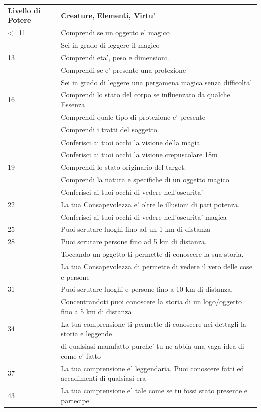\documentclass[a4paper,11pt,twoside,openany]{book}
\begin{document}
\begin{tabularx}{\textwidth}{lX}
	\toprule
	\textbf{Livello di Potere} & \textbf{Creature, Elementi, Virtu'}\tabularnewline
	<=11   & Comprendi se un oggetto e’ magico  \\
	  & Sei in grado di leggere il magico  \\
	13& Comprendi eta’, peso e dimensioni. \\
	  & Comprendi se e’ presente una protezione \\
	  & Sei in grado di leggere una pergamena magica senza difficolta’   \\
	16& Comprendi lo stato del corpo se influenzato da qualche Essenza   \\
	  & Comprendi quale tipo di protezione e’ presente    \\
	  & Comprendi i tratti del soggetto.   \\
	  & Conferisci ai tuoi occhi la visione della magia   \\
	  & Conferisci ai tuoi occhi la visione crepuscolare 18m   \\
	19& Comprendi lo stato originario del target.    \\
	  & Comprendi la natura e specifiche di un oggetto magico  \\
	  & Conferisci ai tuoi occhi di vedere nell’oscurita’ \\
	22& La tua Consapevolezza e’ oltre le illusioni di pari potenza.\\
	  & Conferisci ai tuoi occhi di vedere nell’oscurita’ magica    \\
	25& Puoi scrutare luoghi fino ad un 1 km di distanza  \\
	28& Puoi scrutare persone fino ad 5 km di distanza.   \\
	  & Toccando un oggetto ti permette di conoscere la sua storia. \\
	  & La tua Consapevolezza di permette di vedere il vero delle cose e persone   \\
	31& Puoi scrutare luoghi e persone fino a 10 km di distanza.    \\
	  & Concentrandoti puoi conoscere la storia di un logo/oggetto fino a 5 km di distanza   \\
	34& La tua comprensione ti permette di conoscere nei dettagli la storia e
	leggende \\
	  & di qualsiasi manufatto purche’ tu ne abbia una vaga idea di come e’ fatto  \\
	37& La tua comprensione e’ leggendaria. Puoi conoscere fatti ed accadimenti  di qualsiasi era \\
	43& La tua comprensione e’ tale come se tu fossi stato presente e partecipe    \\
\end{tabularx}
\end{document}
